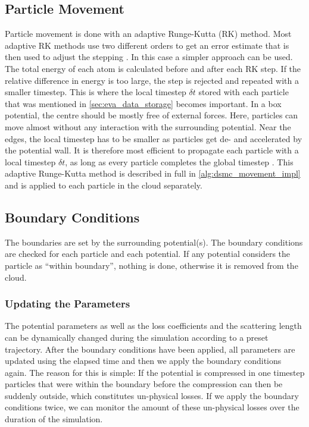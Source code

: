 \subsection{Particle Movement} \label{sec:particlemovement}
Particle movement is done with an adaptive Runge-Kutta (RK) method. Most adaptive RK methods use two different orders to get an error estimate that is then used to adjust the stepping \cite{rungekutta}. In this case a simpler approach can be used. The total energy of each atom is calculated before and after each RK step. If the relative difference in energy is too large, the step is rejected and repeated with a smaller timestep. This is where the local timestep $\delta t$ stored with each particle that was mentioned in \cref{sec:eva_data_storage} becomes important. In a box potential, the centre should be mostly free of external forces. Here, particles can move almost without any interaction with the surrounding potential. Near the edges, the local timestep has to be smaller as particles get de- and accelerated by the potential wall. It is therefore most efficient to propagate each particle with a local timestep $\delta t$, as long as every particle completes the global timestep \Dt. This adaptive Runge-Kutta method is described in full in \cref{alg:dsmc_movement_impl} and is applied to each particle in the cloud separately.

\subsection{Boundary Conditions}
The boundaries are set by the surrounding potential(s). The boundary conditions are checked for each particle and each potential. If any potential considers the particle as \enquote{within boundary}, nothing is done, otherwise it is removed from the cloud.

\subsubsection*{Updating the Parameters}
The potential parameters as well as the loss coefficients and the scattering length can be dynamically changed during the simulation according to a preset trajectory. After the boundary conditions have been applied, all parameters are updated using the elapsed time and then we apply the boundary conditions again. The reason for this is simple: If the potential is compressed in one timestep particles that were within the boundary before the compression can then be suddenly outside, which constitutes un-physical losses. If we apply the boundary conditions twice, we can monitor the amount of these un-physical losses over the duration of the simulation.

